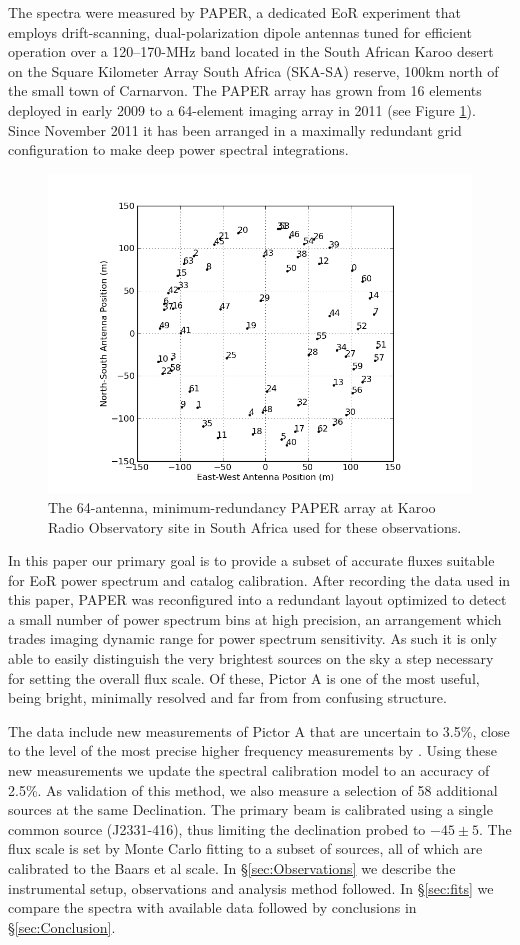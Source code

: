 \documentclass[preprint]{aastex}
\begin{document}
The spectra were measured by PAPER, a dedicated EoR experiment 
that employs drift-scanning, dual-polarization dipole antennas 
tuned for efficient operation over a 120--170-MHz band located in the South African Karoo desert
on the Square Kilometer Array
South Africa (SKA-SA) reserve, 100km north of the small town of Carnarvon.
The PAPER array has grown from 16 elements deployed in early 2009 to a
64-element imaging array in 2011 (see Figure \ref{fig:antpos}). Since November 2011 it has been arranged in a maximally redundant grid configuration to make deep power spectral integrations.  
\begin{figure}\centering
\includegraphics[width=0.85\columnwidth]{plots/antpos.png}
\caption{The 64-antenna, minimum-redundancy PAPER array at Karoo Radio Observatory site in South Africa used for these observations.
}\label{fig:antpos}
\end{figure}

In this paper our primary goal is to provide a subset of accurate fluxes suitable for EoR power spectrum and catalog calibration.  After recording the data used in this paper, PAPER was reconfigured into a redundant layout optimized to detect a small number of power spectrum bins at high precision, an arrangement which trades imaging dynamic range for power spectrum sensitivity. As such it is only able to easily distinguish the very brightest sources on the sky a step necessary for setting the overall flux scale. Of these, Pictor A is one of the most useful, being bright, minimally resolved and far from from confusing structure. 

The data  include new measurements of Pictor A that are uncertain to 3.5\%, close to the level of the most precise higher frequency measurements by \citet{Wills:1975p9314}. Using these new measurements we update the spectral calibration model to an accuracy of 2.5\%. As validation of this method, we also measure a selection of 58 additional sources at the same Declination.  The primary beam is calibrated using a single common source (J2331-416), thus limiting the declination probed to $-45 \pm 5$\arcdeg.  The flux scale is set by Monte Carlo fitting to a subset of sources, all of which are calibrated to the Baars et al scale. In \S\ref{sec:Observations} we describe the instrumental setup, observations and analysis method followed. In \S\ref{sec:fits} we compare the spectra with available data followed by conclusions in \S\ref{sec:Conclusion}.
\end{document}
